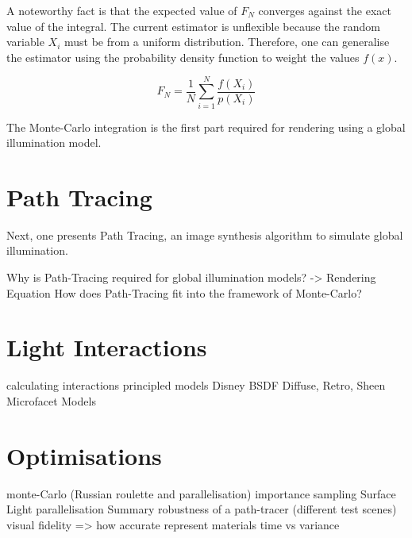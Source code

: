 A noteworthy fact is that the expected value of $F_N$ converges against the exact value of the integral.
The current estimator is unflexible because the random variable $X_i$ must be from a uniform distribution.
Therefore, one can generalise the estimator using the probability density function to weight the values $f(x)$.

$$
F_N=\frac{1}{N}\sum_{i=1}^{N}\frac{f(X_i)}{p(X_i)}
$$

The Monte-Carlo integration is the first part required for rendering using a global illumination model.
\cite{veach_optimally_1995}

\section{Path Tracing}

Next, one presents Path Tracing, an image synthesis algorithm to simulate global illumination.


Why is Path-Tracing required for global illumination models? -> Rendering Equation
How does Path-Tracing fit into the framework of Monte-Carlo?
\section{Light Interactions}
calculating interactions
principled models
Disney BSDF
Diffuse, Retro, Sheen
Microfacet Models
\section{Optimisations}
monte-Carlo (Russian roulette and parallelisation)
importance sampling
Surface
Light
parallelisation
Summary
robustness of a path-tracer (different test scenes)
visual fidelity => how accurate represent materials
time vs variance
